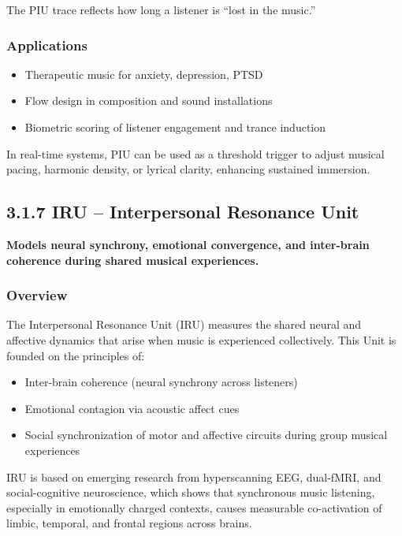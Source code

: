 \documentclass[10pt]{article}
\begin{document}
The PIU trace reflects how long a listener is “lost in the music.”

\subsubsection*{Applications}

\begin{itemize}
    \item Therapeutic music for anxiety, depression, PTSD
    \item Flow design in composition and sound installations
    \item Biometric scoring of listener engagement and trance induction
\end{itemize}

In real-time systems, PIU can be used as a threshold trigger to adjust musical pacing, harmonic density, or lyrical clarity, enhancing sustained immersion.

\subsection*{3.1.7 IRU – Interpersonal Resonance Unit}

\textbf{Models neural synchrony, emotional convergence, and inter-brain coherence during shared musical experiences.}

\subsubsection*{Overview}

The Interpersonal Resonance Unit (IRU) measures the shared neural and affective dynamics that arise when music is experienced collectively. This Unit is founded on the principles of:

\begin{itemize}
    \item Inter-brain coherence (neural synchrony across listeners)
    \item Emotional contagion via acoustic affect cues
    \item Social synchronization of motor and affective circuits during group musical experiences
\end{itemize}

IRU is based on emerging research from hyperscanning EEG, dual-fMRI, and social-cognitive neuroscience, which shows that synchronous music listening, especially in emotionally charged contexts, causes measurable co-activation of limbic, temporal, and frontal regions across brains.
\end{document}
